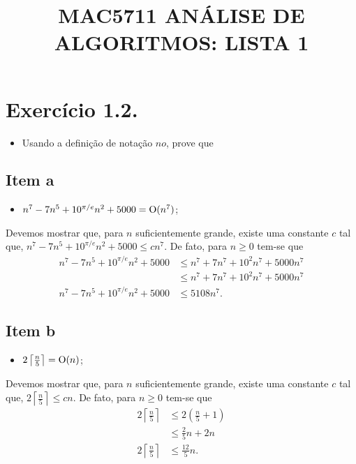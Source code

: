 \documentclass[a4paper]{article}
\title{MAC5711 ANÁLISE DE ALGORITMOS: LISTA 1}
\date{}
\newcommand{\no}{{ \rm O }}
\newenvironment{myproof}[1][\proofname]{%
  \proof[\ttfamily \large #1]%
}{\endproof}
\begin{document}
\maketitle

\section*{Exercício 1.2.}

\begin{itemize}
    \item Usando a definição de notação $no$, prove que
\end{itemize}

\subsection*{Item a}

\begin{itemize}
    \item $n^7-7n^5+10^{\pi/e}n^2+5000=\no(n^7)$;
\end{itemize}

\begin{myproof}[prova]
    Devemos mostrar que, para $n$ suficientemente grande, existe uma constante $c$ tal que, $n^7-7n^5+10^{\pi/e}n^2+5000 \leq cn^7$. De fato, para $n\geq 0$ tem-se que
    \begin{align*}
        n^7-7n^5+10^{\pi/e}n^2+5000 &\leq n^7+7n^7+10^{2}n^7+5000 n^7\\
        &\leq n^7+7n^7+10^{2}n^7+5000 n^7\\
        n^7-7n^5+10^{\pi/e}n^2+5000&\leq 5108 n^7.
    \end{align*}
\end{myproof}
\subsection*{Item b}

\begin{itemize}
    \item $2\left\lceil\frac{n}{5}\right\rceil=\no(n)$;
\end{itemize}

\begin{myproof}[prova]
    Devemos mostrar que, para $n$ suficientemente grande, existe uma constante $c$ tal que, $2\left\lceil\frac{n}{5}\right\rceil \leq cn$. De fato, para $n\geq 0$ tem-se que
    \begin{align*}
        2\left\lceil\frac{n}{5}\right\rceil &\leq 2\left(\frac{n}{5}+1\right)\\
        &\leq\frac{2}{5}n + 2n\\
        2\left\lceil\frac{n}{5}\right\rceil&\leq \frac{12}{5}n.\\
    \end{align*}
\end{myproof}
\end{document}
